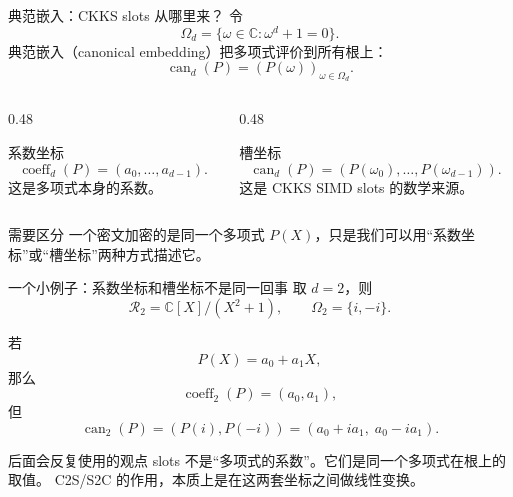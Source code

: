 \documentclass[aspectratio=169, 10pt, xcolor=svgnames, table, UTF8]{ctexbeamer}
\begin{document}
\begin{frame}{典范嵌入：CKKS slots 从哪里来？}
  令
  \[
  \Omega_d=\{\omega\in\mathbb C:\omega^d+1=0\}.
  \]
  典范嵌入（canonical embedding）把多项式评价到所有根上：
  \[
  \operatorname{can}_d(P)
  =
  (P(\omega))_{\omega\in\Omega_d}.
  \]
  
  \pause
  \begin{columns}
    \begin{column}{0.48\linewidth}
      \begin{block}{系数坐标}
        \[
        \operatorname{coeff}_d(P)
        =
        (a_0,\ldots,a_{d-1}).
        \]
        这是多项式本身的系数。
      \end{block}
    \end{column}
    \begin{column}{0.48\linewidth}
      \begin{block}{槽坐标}
        \[
        \operatorname{can}_d(P)
        =
        (P(\omega_0),\ldots,P(\omega_{d-1})).
        \]
        这是 CKKS SIMD slots 的数学来源。
      \end{block}
    \end{column}
  \end{columns}
  
  \pause
  \begin{alertblock}{需要区分}
    一个密文加密的是同一个多项式 \(P(X)\)，只是我们可以用“系数坐标”或“槽坐标”两种方式描述它。
  \end{alertblock}
\end{frame}

\begin{frame}{一个小例子：系数坐标和槽坐标不是同一回事}
  取 \(d=2\)，则
  \[
  \mathcal R_2=\mathbb C[X]/(X^2+1),
  \qquad \Omega_2=\{i,-i\}.
  \]
  
  若
  \[
  P(X)=a_0+a_1X,
  \]
  那么
  \[
  \operatorname{coeff}_2(P)=(a_0,a_1),
  \]
  但
  \[
  \operatorname{can}_2(P)=(P(i),P(-i))=(a_0+ia_1,\;a_0-ia_1).
  \]
  
  \pause
  \begin{exampleblock}{后面会反复使用的观点}
    slots 不是“多项式的系数”。它们是同一个多项式在根上的取值。
    C2S/S2C 的作用，本质上是在这两套坐标之间做线性变换。
  \end{exampleblock}
\end{frame}
\end{document}
